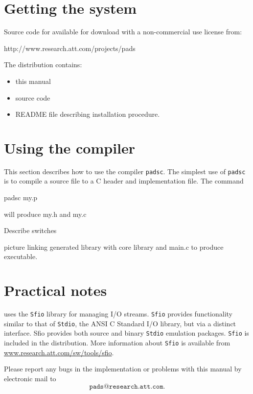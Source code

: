 \section{Getting the \PADS{} system}
Source code for \PADS{} available for download with
a non-commercial use license from: 
\begin{centercode}
http://www.research.att.com/projects/pads
\end{centercode}

The \PADS{} distribution contains:
\begin{itemize}
\item this manual
\item source code 
\item README file describing installation procedure.
\end{itemize}

\section{Using the \PADS{} compiler}
This section describes how to use the \PADS{} compiler \texttt{padsc}.
The simplest use of \texttt{padsc} is to compile a \PADSL{} source file
to a C header and implementation file.  The command
\begin{centercode}
padsc my.p
\end{centercode} %
will produce my.h and my.c

Describe switches

picture linking generated library with core library and main.c to
produce executable.

\section{Practical notes}
\pads{} uses the \texttt{Sfio} library for managing I/O
streams. \texttt{Sfio} provides functionality similar to that of
\texttt{Stdio}, the ANSI C Standard I/O library, but via a distinct
interface.  Sfio provides both source and binary \texttt{Stdio}
emulation packages. \texttt{Sfio} is included in the \pads{}
distribution.  More information about \texttt{Sfio} is available from
\url{www.research.att.com/sw/tools/sfio}.


Please report any bugs in the \PADS{} implementation or problems with
this manual by electronic mail to 
\[
\texttt{pads@research.att.com}.
\]